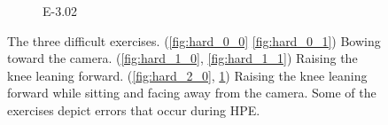 \begin{figure}[htb]
\begin{subfigure}[b]{0.29\linewidth}
      \caption[]{E-3.02}
      \label{fig:hard_2_1}
  \end{subfigure}
  \caption[Difficult Exercises]{The three difficult exercises. (\ref{fig:hard_0_0} \ref{fig:hard_0_1}) Bowing toward the camera. (\ref{fig:hard_1_0}, \ref{fig:hard_1_1}) Raising the knee leaning forward. (\ref{fig:hard_2_0}, \ref{fig:hard_2_1}) Raising the knee leaning forward while sitting and facing away from the camera. Some of the exercises depict errors that occur during HPE.}
  \label{fig:difficult_exercises}
\end{figure}

\FloatBarrier
